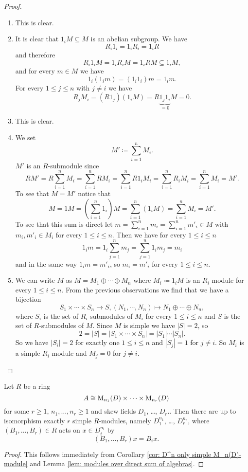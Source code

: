 \begin{proof}
 \begin{enumerate}[label=\emph{\alph*}),leftmargin=*]
  \item
   This is clear.
  \item
   It is clear that $1_i M \subseteq M$ is an abelian subgroup. We have
   \[
    R_i 1_i = 1_i R_i = 1_i R
   \]
   and therefore
   \[
    R_i 1_i M = 1_i R_i M = 1_i R M \subseteq 1_i M,
   \]
   and for every $m \in M$ we have
   \[
    1_i (1_i m) = (1_i 1_i) m = 1_i m.
   \]
   For every $1 \leq j \leq n$ with $j \neq i$ we have
   \[
    R_j M_i = (R 1_j) (1_i M) = R \underbrace{1_j 1_i}_{=0} M = 0.
   \]
  \item
   This is clear.
  \item
   We set
   \[
    M' \coloneqq \sum_{i=1}^n M_i.
   \]
   $M'$ is an $R$-submodule since
   \[
    R M'
    = R \sum_{i=1}^n M_i
    = \sum_{i=1}^n R M_i
    = \sum_{i=1}^n R 1_i M_i
    = \sum_{i=1}^n R_i M_i
    = \sum_{i=1}^n M_i
    = M'.
   \]
   To see that $M = M'$ notice that
   \[
    M
    = 1 M
    = \left( \sum_{i=1}^n 1_i \right) M
    = \sum_{i=1}^n (1_i M)
    = \sum_{i=1}^n M_i
    = M'.
   \]
   To see that this sum is direct let $m = \sum_{i=1}^n m_i = \sum_{i=1}^n m'_i \in M$ with $m_i, m'_i \in M_i$ for every $1 \leq i \leq n$. Then we have for every $1 \leq i \leq n$
   \[
    1_i m
    = 1_i \sum_{j=1}^n m_j
    = \sum_{j=1}^n 1_i m_j
    = m_i
   \]
   and in the same way $1_i m = m'_i$, so $m_i = m'_i$ for every $1 \leq i \leq n$.
  \item
   We can write $M$ as $M = M_1 \oplus \dotsb \oplus M_n$ where $M_i \coloneqq 1_i M$ is an $R_i$-module for every $1 \leq i \leq n$. From the previous observations we find that we have a bijection
   \[
    S_1 \times \dotsb \times S_n \to S, (N_1, \dotsb, N_n) \mapsto N_1 \oplus \dotsb \oplus N_n,
   \]
   where $S_i$ is the set of $R_i$-submodules of $M_i$ for every $1 \leq i \leq n$ and $S$ is the set of $R$-submodules of $M$. Since $M$ is simple we have $|S| = 2$, so
   \[
    2 = |S| = |S_1 \times \dotsb \times S_n| = |S_1| \dotsm |S_n|.
   \]
   So we have $|S_i| = 2$ for exactly one $1 \leq i \leq n$ and $|S_j| = 1$ for $j \neq i$. So $M_i$ is a simple $R_i$-module and $M_j = 0$ for $j \neq i$.
  \qedhere
 \end{enumerate}
\end{proof}


\begin{cor}\label{cor: simple modules over product of matrix algebras}
 Let $R$ be a ring
 \[
  A \cong \operatorname{M}_{n_1}(D) \times \dotsb \times \operatorname{M}_{n_r}(D)
 \]
 for some $r \geq 1$, $n_1, \dotsc, n_r \geq 1$ and skew fields $D_1$, \dots, $D_r$.. Then there are up to isomorphism exactly $r$ simple $R$-modules, namely $D_1^{n_1}$, \dots, $D_r^{n_r}$, where $(B_1, \dotsc, B_r) \in R$ acts on $x \in D_i^{n_i}$ by
 \[
  (B_1, \dotsc, B_r) x =  B_i x.
 \]
\end{cor}
\begin{proof}
 This follows immediately from Corollary \ref{cor: D^n only simple M_n(D)-module} and Lemma \ref{lem: modules over direct sum of algebras}.
\end{proof}


